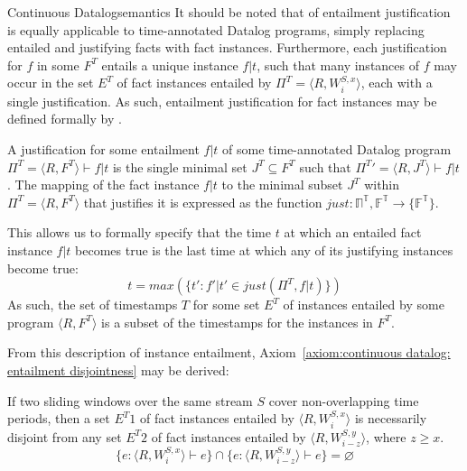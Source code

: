 \begin{nestedsection}{Continuous Datalog}{semantics}
It should be noted that  of entailment
justification is equally applicable to time-annotated Datalog programs,
simply replacing entailed and justifying facts with fact instances.
Furthermore, each justification for $f$ in some $F^T$ entails a unique
instance ${f | t}$, such that many instances of $f$ may occur in the set
$E^T$ of fact instances entailed by
${\Pi^T = \langle R, W^{S,x}_i \rangle}$, each with a single
justification.  As such, entailment justification for fact instances may be
defined formally by .
\begin{definition}
	A justification for some entailment ${f|t}$ of some time-annotated Datalog program
	${\Pi^T = \langle R , F^T \rangle \vdash f|t}$ is the single minimal set ${J^T \subseteq F^T}$
	such that ${\Pi^T' = \langle R , J^T \rangle \vdash f|t}$.
	The mapping of the fact instance ${f | t}$ to the minimal subset $J^T$
	within ${\Pi^T = \langle R, F^T \rangle}$ that justifies it is expressed
	as the function ${just : \mathbb{\Pi^T} , \mathbb{F^T} \rightarrow \{ \mathbb{F^T} \}}$.
\end{definition}

This allows us to formally specify that the time $t$ at which an entailed fact
instance ${f | t}$ becomes true is the last time at which any of its
justifying instances become true:
\[ t = max(\{ t' : f' | t' \in just(\Pi^T, f | t) \}) \]
As such, the set of timestamps $T$ for some set $E^T$ of instances entailed by some
program ${\langle R, F^T \rangle}$ is a subset of the timestamps for the instances in $F^T$.

From this description of instance entailment,
Axiom~\ref{axiom:continuous datalog: entailment disjointness} may be
derived:

\begin{axiom}\label{axiom:continuous datalog: entailment disjointness}
If two sliding windows over the same stream $S$ cover non-overlapping time periods,
then a set ${E^T1}$ of fact instances entailed by ${\langle R, W^{S,x}_i \rangle}$
is necessarily disjoint from any set ${E^T2}$ of fact instances entailed by
${\langle R, W^{S,y}_{i-z} \rangle}$, where ${z \geq x}$.
\[ \{ e : \langle R , W^{S,x}_i \rangle \vdash e \} \cap \{ e : \langle R , W^{S,y}_{i-z} \rangle \vdash e \} = \varnothing \]
\end{axiom}


\end{nestedsection}
